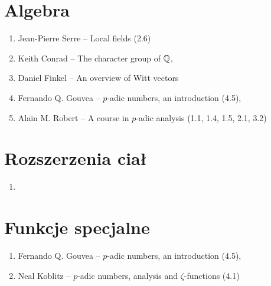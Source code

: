 \section{Algebra}
\begin{enumerate}
	\item Jean-Pierre Serre -- Local fields (2.6)
	\item Keith Conrad -- The character group of $\mathbb Q$, 
	\item Daniel Finkel -- An overview of Witt vectors
	\item Fernando Q. Gouvea -- $p$-adic numbers, an introduction (4.5),
	\item Alain M. Robert -- A course in $p$-adic analysis (1.1, 1.4, 1.5, 2.1, 3.2)
\end{enumerate}

\section{Rozszerzenia ciał}
\begin{enumerate}
	\item %
\end{enumerate}

\section{Funkcje specjalne}
\begin{enumerate}
	\item Fernando Q. Gouvea -- $p$-adic numbers, an introduction (4.5),
	\item Neal Koblitz -- $p$-adic numbers, analysis and $\zeta$-functions (4.1)
\end{enumerate}




